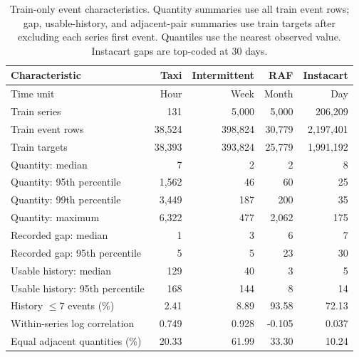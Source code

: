 \begin{table}[t]
\caption{Train-only event characteristics. Quantity summaries use all train event rows; gap, usable-history, and adjacent-pair summaries use train targets after excluding each series\textquotesingle{} first event. Quantiles use the nearest observed value. Instacart gaps are top-coded at 30 days.}
\label{tab:train-characteristics}\centering\scriptsize
\setlength{\tabcolsep}{4pt}
\begin{tabular}{lrrrr}
\toprule
Characteristic & Taxi & Intermittent & RAF & Instacart\\
\midrule
Time unit & Hour & Week & Month & Day\\
Train series & 131 & 5,000 & 5,000 & 206,209\\
Train event rows & 38,524 & 398,824 & 30,779 & 2,197,401\\
Train targets & 38,393 & 393,824 & 25,779 & 1,991,192\\
Quantity: median & 7 & 2 & 2 & 8\\
Quantity: 95th percentile & 1,562 & 46 & 60 & 25\\
Quantity: 99th percentile & 3,449 & 187 & 200 & 35\\
Quantity: maximum & 6,322 & 477 & 2,062 & 175\\
Recorded gap: median & 1 & 3 & 6 & 7\\
Recorded gap: 95th percentile & 5 & 5 & 23 & 30\\
Usable history: median & 129 & 40 & 3 & 5\\
Usable history: 95th percentile & 168 & 144 & 8 & 14\\
History $\le7$ events (\%) & 2.41 & 8.89 & 93.58 & 72.13\\
Within-series log correlation & 0.749 & 0.928 & -0.105 & 0.037\\
Equal adjacent quantities (\%) & 20.33 & 61.99 & 33.30 & 10.24\\
\bottomrule
\end{tabular}
\end{table}

